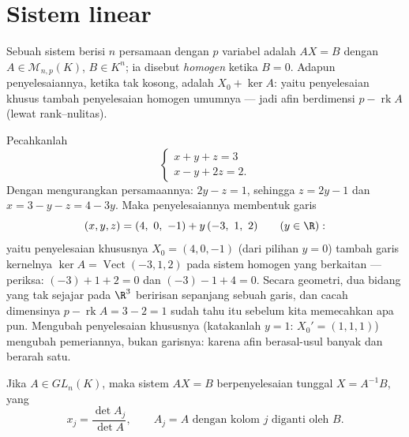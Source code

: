 \section{Sistem linear}

\begin{definition}\label{def:b1:det:system}
Sebuah sistem  berisi $n$ persamaan dengan $p$
variabel adalah $AX = B$ dengan $A \in \mathcal{M}_{n,p}(K)$, $B \in
K^n$; ia disebut \emph{homogen} ketika $B = 0$. Adapun  penyelesaiannya, ketika
tak kosong, adalah $X_0 + \ker A$: yaitu penyelesaian khusus tambah penyelesaian
homogen umumnya --- jadi  afin berdimensi $p -
\operatorname{rk} A$ (lewat rank--nulitas).
\end{definition}

\begin{example}
\label{ex:b1:det:affinestructure}
Pecahkanlah
\[
\begin{cases}
x + y + z = 3\\
x - y + 2z = 2 .
\end{cases}
\]
Dengan mengurangkan persamaannya: $2y - z = 1$, sehingga $z = 2y - 1$ dan $x =
3 - y - z = 4 - 3y$. Maka penyelesaiannya membentuk garis
\[
(x, y, z) = (4,\ 0,\ -1) + y\,(-3,\ 1,\ 2)
\qquad (y \in \R):
\]
yaitu penyelesaian khususnya $X_0 = (4, 0, -1)$ (dari pilihan $y = 0$)
tambah garis kernelnya $\ker A = \operatorname{Vect}(-3, 1, 2)$ pada
sistem homogen yang berkaitan --- periksa: $(-3) + 1 + 2 = 0$
dan $(-3) - 1 + 4 = 0$. Secara geometri, dua bidang yang tak sejajar pada
$\R^3$ beririsan sepanjang sebuah garis, dan cacah dimensinya $p -
\operatorname{rk} A = 3 - 2 = 1$ sudah tahu itu sebelum kita memecahkan
apa pun. Mengubah penyelesaian khususnya (katakanlah $y = 1$: $X_0' =
(1, 1, 1)$) mengubah pemeriannya, bukan garisnya: karena 
afin berasal-usul banyak dan berarah satu.
\end{example}

\begin{theorem}\label{thm:b1:det:cramer}
Jika $A \in GL_n(K)$, maka sistem $AX = B$ berpenyelesaian tunggal $X =
A^{-1}B$, yang 
\[
x_j = \frac{\det A_j}{\det A},
\qquad A_j = A \text{ dengan kolom } j \text{ diganti oleh } B .
\]
\end{theorem}

